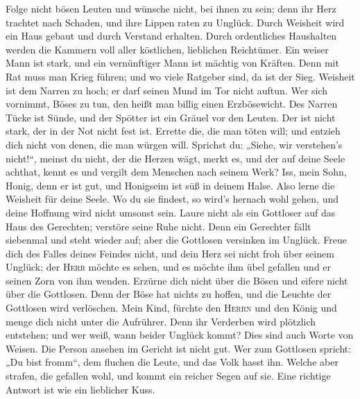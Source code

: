  Folge nicht bösen Leuten und wünsche nicht, bei ihnen zu
sein;  denn ihr Herz trachtet nach Schaden, und ihre
Lippen raten zu Unglück.  Durch Weisheit wird ein Haus
gebaut und durch Verstand erhalten.  Durch ordentliches
Haushalten werden die Kammern voll aller köstlichen, lieblichen
Reichtümer.  Ein weiser Mann ist stark, und ein
vernünftiger Mann ist mächtig von Kräften.  Denn mit Rat
muss man Krieg führen; und wo viele Ratgeber sind, da ist der Sieg.
 Weisheit ist dem Narren zu hoch; er darf seinen Mund im
Tor nicht auftun.  Wer sich vornimmt, Böses zu tun, den
heißt man billig einen Erzbösewicht.  Des Narren Tücke ist
Sünde, und der Spötter ist ein Gräuel vor den Leuten. 
Der ist nicht stark, der in der Not nicht fest ist. 
Errette die, die man töten will; und entzieh dich nicht von denen, die
man würgen will.  Sprichst du: „Siehe, wir verstehen's
nicht!{}``, meinst du nicht, der die Herzen wägt, merkt es, und der auf
deine Seele achthat, kennt es und vergilt dem Menschen nach seinem Werk?
 Iss, mein Sohn, Honig, denn er ist gut, und Honigseim
ist süß in deinem Halse.  Also lerne die Weisheit für
deine Seele. Wo du sie findest, so wird's hernach wohl gehen, und deine
Hoffnung wird nicht umsonst sein.  Laure nicht als ein
Gottloser auf das Haus des Gerechten; verstöre seine Ruhe nicht.
 Denn ein Gerechter fällt siebenmal und steht wieder auf;
aber die Gottlosen versinken im Unglück.  Freue dich des
Falles deines Feindes nicht, und dein Herz sei nicht froh über seinem
Unglück;  der \textsc{Herr} möchte es sehen, und es
möchte ihm übel gefallen und er seinen Zorn von ihm wenden.
 Erzürne dich nicht über die Bösen und eifere nicht über
die Gottlosen.  Denn der Böse hat nichts zu hoffen, und
die Leuchte der Gottlosen wird verlöschen.  Mein Kind,
fürchte den \textsc{Herrn} und den König und menge dich nicht unter die
Aufrührer.  Denn ihr Verderben wird plötzlich entstehen;
und wer weiß, wann beider Unglück kommt?  Dies sind auch
Worte von Weisen. Die Person ansehen im Gericht ist nicht gut.
 Wer zum Gottlosen spricht: „Du bist fromm``, dem fluchen
die Leute, und das Volk hasst ihn.  Welche aber strafen,
die gefallen wohl, und kommt ein reicher Segen auf sie. 
Eine richtige Antwort ist wie ein lieblicher Kuss. 
